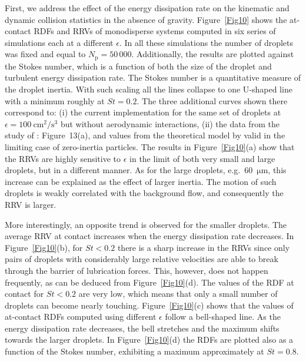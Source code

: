 \documentclass[../thesis.tex]{subfiles}
\begin{document}
First, we address the effect of the energy dissipation rate on the kinematic and dynamic collision statistics in the absence of gravity. Figure~\ref{Fig10} shows the at-contact RDFs and RRVs of monodisperse systems computed in six series of simulations each at a different $\epsilon$. In all these simulations the number of droplets was fixed and equal to $N_\text{p} = 50\,000$. Additionally, the results are plotted against the Stokes number, which is a function of both the size of the droplet and turbulent energy dissipation rate. The Stokes number is a quantitative measure of the droplet inertia. With such scaling all the lines collapse to one U-shaped line with a minimum roughly at $St = 0.2$. The three additional curves shown there correspond to: (i) the current implementation for the same set of droplets at $\epsilon = 100~\mathrm{cm^2/s^3}$ but without aerodynamic interactions, (ii) the data from the study of \cite{RPAGW13}: Figure~13(a), and values from the theoretical model by \cite{ST56} valid in the limiting case of zero-inertia particles. The results in Figure~\ref{Fig10}(a) show that the RRVs are highly sensitive to $\epsilon$ in the limit of both very small and large droplets, but in a different manner. As for the large droplets, e.g.\ 60~$\mathrm{\mu m}$, this increase can be explained as the effect of larger inertia. The motion of such droplets is weakly correlated with the background flow, and consequently the RRV is larger. 

More interestingly, an opposite trend is observed for the smaller droplets. The average RRV at contact increases when the energy dissipation rate decreases. In Figure~\ref{Fig10}(b), for $St < 0.2$ there is a sharp increase in the RRVs since only pairs of droplets with considerably large relative velocities are able to break through the barrier of lubrication forces. This, however, does not happen frequently, as can be deduced from Figure~\ref{Fig10}(d). The values of the RDF at contact for $St < 0.2$ are very low, which means that only a small number of droplets can become nearly touching. Figure~\ref{Fig10}(c) shows that the values of at-contact RDFs computed using different $\epsilon$ follow a bell-shaped line. As the energy dissipation rate decreases, the bell stretches and the maximum shifts towards the larger droplets. In Figure~\ref{Fig10}(d) the RDFs are plotted also as a function of the Stokes number, exhibiting a maximum approximately at $St = 0.8$. 
\end{document}
